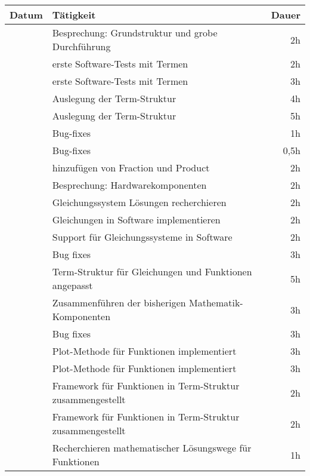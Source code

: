 \begin{longtabu} to \textwidth{l | X | r}
	\textbf{Datum} & \textbf{Tätigkeit} & \textbf{Dauer}\\\hline
	
	 & Besprechung: Grundstruktur und grobe Durchführung & 2h\\\hline
	
	 & erste Software-Tests mit Termen & 2h\\\hline
	 & erste Software-Tests mit Termen & 3h\\\hline
	 & Auslegung der Term-Struktur & 4h\\\hline
	 & Auslegung der Term-Struktur & 5h\\\hline
	 & Bug-fixes & 1h\\\hline
	 & Bug-fixes & 0,5h\\\hline
	 & hinzufügen von Fraction und Product & 2h\\\hline
	 & Besprechung: Hardwarekomponenten & 2h\\\hline
	
	 & Gleichungssystem Lösungen recherchieren & 2h\\\hline
	 & Gleichungen in Software implementieren & 2h\\\hline
	 & Support für Gleichungssysteme in Software & 2h\\\hline
	 & Bug fixes & 3h\\\hline
	 & Term-Struktur für Gleichungen und Funktionen angepasst & 5h\\\hline
	 & Zusammenführen der bisherigen Mathematik-Komponenten & 3h\\\hline
	 & Bug fixes & 3h\\\hline
	 & Plot-Methode für Funktionen implementiert & 3h\\\hline
	 & Plot-Methode für Funktionen implementiert & 3h\\\hline
	 & Framework für Funktionen in Term-Struktur zusammengestellt & 2h\\\hline
	 & Framework für Funktionen in Term-Struktur zusammengestellt & 2h\\\hline
	 & Recherchieren mathematischer Lösungswege für Funktionen  & 1h\\\hline
	

\end{longtabu}
